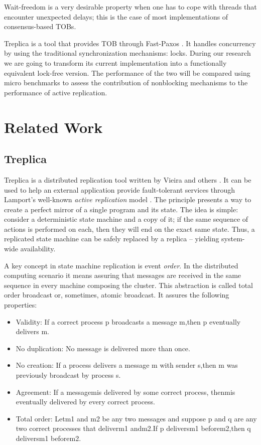 \documentclass[12pt,twoside,a4paper]{article}
\begin{document}
Wait-freedom is a very  desirable property when one has to cope with threads
that encounter unexpected delays; this  is the case
of  most  implementations of  consensus-based  TOBs.

Treplica \cite{vieira2008} is a tool that provides TOB through Fast-Paxos
\cite{Lamport2006}. It handles concurrency by using the traditional
synchronization mechanisms: locks. During our research we are going to transform
its current implementation  into a functionally equivalent lock-free version.
The  performance of the two will be compared using micro benchmarks to assess
the contribution  of nonblocking mechanisms to the  performance of active
replication.


\section{Related Work}
\label{sec:related}
\subsection{Treplica}
Treplica is a distributed replication tool written by Vieira and others \cite{vieira2008}. It can be used to help an external application provide fault-tolerant services through Lamport's well-known \textit{active replication} model \cite{Lamport1978}. The principle presents a way to create a perfect mirror of a single program and its state. The idea is simple: consider a deterministic state machine and a copy of it; if the same sequence of actions is performed on each, then they will end on the exact same state. Thus, a replicated state machine can be safely replaced by a replica -- yielding system-wide availability.

A key concept in state machine replication is event \textit{order}. In the distributed computing scenario it means assuring that messages are received in the same sequence in every machine composing the cluster. This abstraction is called total order broadcast or, sometimes, atomic broadcast. It assures the following properties:

\begin{itemize}
\item Validity: If a correct process p broadcasts a message m,then p eventually delivers m.
\item No duplication: No message is delivered more than once.
\item No creation: If a process delivers a message m with sender s,then m was previously broadcast by process s.
\item Agreement: If a messagemis delivered by some correct process, thenmis eventually delivered by every correct process.
\item Total order: Letm1 and m2 be any two messages and suppose p and q are any two correct processes that deliverm1 andm2.If p deliversm1 beforem2,then q deliversm1 beforem2.
\end{itemize}
\end{document}
